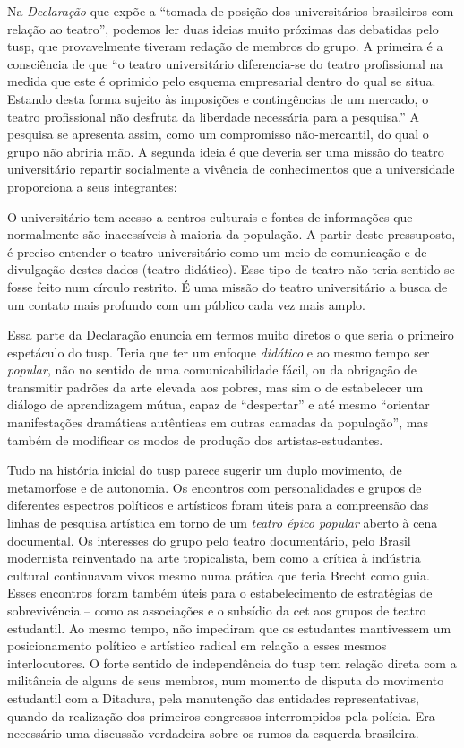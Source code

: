 Na {\it Declaração} que expõe a “tomada de posição dos universitários
brasileiros com relação ao teatro”, podemos ler duas ideias muito
próximas das debatidas pelo {\sc tusp}, que provavelmente tiveram redação de
membros do grupo. A primeira é a consciência de que “o teatro
universitário diferencia-se do teatro profissional na medida que este é
oprimido pelo esquema empresarial dentro do qual se situa. Estando desta
forma sujeito às imposições e contingências de um mercado, o teatro
profissional não desfruta da liberdade necessária para a pesquisa.” A
pesquisa se apresenta assim, como um compromisso não-mercantil, do qual
o grupo não abriria mão. A segunda ideia é que deveria ser uma missão do
teatro universitário repartir socialmente a vivência de conhecimentos
que a universidade proporciona a seus integrantes:

\startblockquote
O universitário tem acesso a centros culturais e fontes de informações
que normalmente são inacessíveis à maioria da população. A partir deste
pressuposto, é preciso entender o teatro universitário como um meio de
comunicação e de divulgação destes dados (teatro didático). Esse tipo de
teatro não teria sentido se fosse feito num círculo restrito. É uma
missão do teatro universitário a busca de um contato mais profundo com
um público cada vez mais amplo.
\stopblockquote

Essa parte da Declaração enuncia em termos muito diretos o que seria o
primeiro espetáculo do {\sc tusp}. Teria que ter um enfoque {\it didático} e
ao mesmo tempo ser {\it popular}, não no sentido de uma comunicabilidade
fácil, ou da obrigação de transmitir padrões da arte elevada aos pobres,
mas sim o de estabelecer um diálogo de aprendizagem mútua, capaz de
“despertar” e até mesmo “orientar manifestações dramáticas autênticas em
outras camadas da população”, mas também de modificar os modos de
produção dos artistas-estudantes.

Tudo na história inicial do {\sc tusp} parece sugerir um duplo movimento, de
metamorfose e de autonomia. Os encontros com personalidades e grupos de
diferentes espectros políticos e artísticos foram úteis para a
compreensão das linhas de pesquisa artística em torno de um {\it teatro
épico popular} aberto à cena documental. Os interesses do grupo pelo
teatro documentário, pelo Brasil modernista reinventado na arte
tropicalista, bem como a crítica à indústria cultural continuavam vivos
mesmo numa prática que teria Brecht como guia. Esses encontros foram
também úteis para o estabelecimento de estratégias de sobrevivência --
como as associações e o subsídio da {\sc cet} aos grupos de teatro estudantil.
Ao mesmo tempo, não impediram que os estudantes mantivessem um
posicionamento político e artístico radical em relação a esses mesmos
interlocutores. O forte sentido de independência do {\sc tusp} tem relação
direta com a militância de alguns de seus membros, num momento de
disputa do movimento estudantil com a Ditadura, pela manutenção das
entidades representativas, quando da realização dos primeiros congressos
interrompidos pela polícia. Era necessário uma discussão verdadeira
sobre os rumos da esquerda brasileira.

